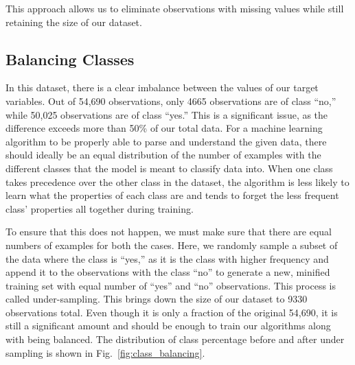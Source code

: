 \documentclass[runningheads]{llncs}
\begin{document}
This approach allows us to eliminate observations with missing values
while still retaining the size of our dataset.

\hypertarget{balancing-classes}{%
\subsection{Balancing Classes}\label{balancing-classes}}

In this dataset, there is a clear imbalance between the values of our
target variables. Out of 54,690 observations, only 4665 observations are
of class ``no,'' while 50,025 observations are of class ``yes.'' This is
a significant issue, as the difference exceeds more than 50\% of our
total data. For a machine learning algorithm to be properly able to
parse and understand the given data, there should ideally be an equal
distribution of the number of examples with the different classes that
the model is meant to classify data into. When one class takes
precedence over the other class in the dataset, the algorithm is less
likely to learn what the properties of each class are and tends to
forget the less frequent class' properties all together during training.

To ensure that this does not happen, we must make sure that there are
equal numbers of examples for both the cases. Here, we randomly sample a
subset of the data where the class is ``yes,'' as it is the class with
higher frequency and append it to the observations with the class ``no''
to generate a new, minified training set with equal number of ``yes''
and ``no'' observations. This process is called under-sampling. This
brings down the size of our dataset to 9330 observations total. Even
though it is only a fraction of the original 54,690, it is still a
significant amount and should be enough to train our algorithms along
with being balanced. The distribution of class percentage before and
after under sampling is shown in Fig.~\ref{fig:class_balancing}.
\end{document}
